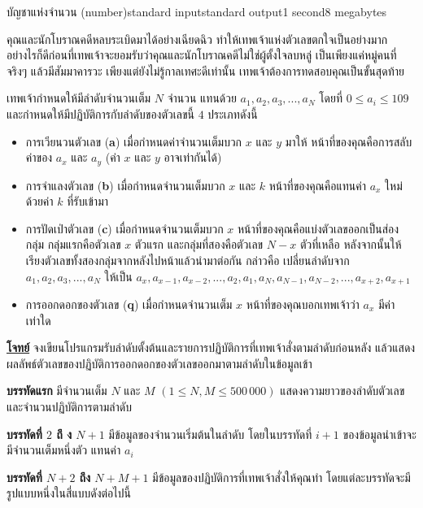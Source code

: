 \documentclass[11pt,a4paper]{article}
\begin{document}
\begin{problem}{บัญชาแห่งจำนวน (number)}{standard input}{standard output}{1 second}{8 megabytes}

    คุณและนักโบราณคดีหลบระเบิดมาได้อย่างเฉียดฉิว ทำให้เทพเจ้าแห่งตัวเลขตกใจเป็นอย่างมาก อย่างไรก็ดีก่อนที่เทพเจ้าจะยอมรับว่าคุณและนักโบราณคดีไม่ใช่ผู้ตั้งใจลบหลู่ เป็นเพียงแค่หมู่คนที่จริงๆ แล้วมีสัมมาคารวะ เพียงแต่ยังไม่รู้กาลเทศะดีเท่านั้น เทพเจ้าต้องการทดสอบคุณเป็นขั้นสุดท้าย

เทพเจ้ากำหนดให้มีลำดับจำนวนเต็ม $N$ จำนวน แทนด้วย $a_1,a_2,a_3,...,a_N$ โดยที่ $0 ≤ a_i ≤ 109$ และกำหนดให้มีปฏิบัติการกับลำดับของตัวเลขนี้ $4$ ประเภทดังนี้

\begin{itemize}

\item การเวียนวนตัวเลข (\textbf{a}) เมื่อกำหนดค่าจำนวนเต็มบวก $x$ และ $y$ มาให้ หน้าที่ของคุณคือการสลับค่าของ $a_x$ และ $a_y$ (ค่า $x$ และ $y$ อาจเท่ากันได้)
\item การจำแลงตัวเลข (\textbf{b}) เมื่อกำหนดจำนวนเต็มบวก $x$ และ $k$ หน้าที่ของคุณคือแทนค่า $a_x$ ใหม่ด้วยค่า $k$ ที่รับเข้ามา
\item การปัดเป่าตัวเลข (\textbf{c}) เมื่อกำหนดจำนวนเต็มบวก $x$ หน้าที่ของคุณคือแบ่งตัวเลขออกเป็นส่องกลุ่ม กลุ่มแรกคือตัวเลข $x$ ตัวแรก และกลุ่มที่สองคือตัวเลข $N - x$ ตัวที่เหลือ หลังจากนั้นให้เรียงตัวเลขทั้งสองกลุ่มจากหลังไปหน้าแล้วนำมาต่อกัน กล่าวคือ เปลี่ยนลำดับจาก  $a_1,a_2,a_3,...,a_N$  ให้เป็น $a_x,a_{x-1},a_{x-2},...,a_2,a_1,a_N,a_{N-1},a_{N-2},...,a_{x+2},a_{x+1}$
\item การออกดอกของตัวเลข (\textbf{q}) เมื่อกำหนดจำนวนเต็ม $x$ หน้าที่ของคุณบอกเทพเจ้าว่า $a_x$ มีค่าเท่าใด
\end{itemize}

\bigskip
\underline{\textbf{โจทย์}}  จงเขียนโปรแกรมรับลำดับตั้งต้นและรายการปฏิบัติการที่เทพเจ้าสั่งตามลำดับก่อนหลัง แล้วแสดงผลลัพธ์ตัวเลขของปฏิบัติการออกดอกของตัวเลขออกมาตามลำดับในข้อมูลเข้า

\InputFile

\textbf{บรรทัดแรก} มีจำนวนเต็ม $N$ และ $M$ $(1 \leq N, M \leq 500\,000)$ แสดงความยาวของลำดับตัวเลข และจำนวนปฏิบัติการตามลำดับ

\textbf{บรรทัดที่ $2$ ถึ ง $N+1$} มีข้อมูลของจำนวนเริ่มต้นในลำดับ โดยในบรรทัดที่ $i + 1$ ของข้อมูลนำเข้าจะมีจำนวนเต็มหนึ่งตัว แทนค่า $a_i$

\textbf{บรรทัดที่ $N+2$ ถึง $N+M+1$} มีข้อมูลของปฏิบัติการที่เทพเจ้าสั่งให้คุณทำ โดยแต่ละบรรทัดจะมีรูปแบบหนึ่งในสี่แบบดังต่อไปนี้


\end{problem}
\end{document}
